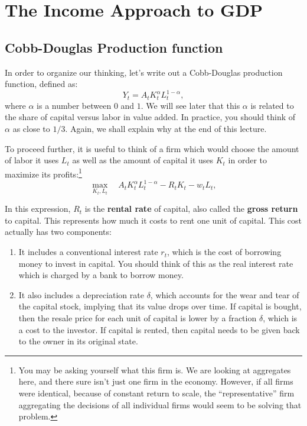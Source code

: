 \documentclass[]{book}
\let\rmarkdownfootnote\footnote%
\def\footnote{\protect\rmarkdownfootnote}
\theoremstyle{definition}
\theoremstyle{definition}
\theoremstyle{definition}
\theoremstyle{remark}
\begin{document}
\hypertarget{gdp-income}{\section{The Income Approach to
GDP}\label{gdp-income}}

\subsection{Cobb-Douglas Production
function}\label{cobb-douglas-production-function}

In order to organize our thinking, let's write out a Cobb-Douglas
production function, defined as:
\[Y_t = A_t K_t^{\alpha} L_t^{1-\alpha},\] where \(\alpha\) is a number
between \(0\) and \(1\). We will see later that this \(\alpha\) is
related to the share of capital versus labor in value added. In
practice, you should think of \(\alpha\) as close to \(1/3\). Again, we
shall explain why at the end of this lecture.

To proceed further, it is useful to think of a firm which would choose
the amount of labor it uses \(L_t\) as well as the amount of capital it
uses \(K_t\) in order to maximize its profits:\footnote{You may be
  asking yourself what this firm is. We are looking at aggregates here,
  and there sure isn't just one firm in the economy. However, if all
  firms were identical, because of constant return to scale, the
  ``representative'' firm aggregating the decisions of all individual
  firms would seem to be solving that problem.}
\[\max_{K_t, L_t} \quad A_t K_t^{\alpha} L_t^{1-\alpha} - R_t K_t - w_t L_t,\]

In this expression, \(R_t\) is the \textbf{rental rate} of capital, also
called the \textbf{gross return} to capital. This represents how much it
costs to rent one unit of capital. This cost actually has two
components:

\begin{enumerate}
\def\labelenumi{\arabic{enumi}.}
\item
  It includes a conventional interest rate \(r_t\), which is the cost of
  borrowing money to invest in capital. You should think of this as the
  real interest rate which is charged by a bank to borrow money.
\item
  It also includes a depreciation rate \(\delta\), which accounts for
  the wear and tear of the capital stock, implying that its value drops
  over time. If capital is bought, then the resale price for each unit
  of capital is lower by a fraction \(\delta\), which is a cost to the
  investor. If capital is rented, then capital needs to be given back to
  the owner in its original state.
\end{enumerate}
\end{document}
